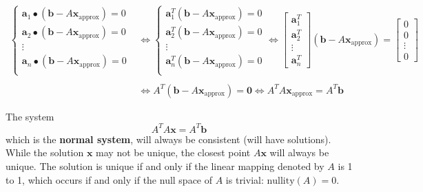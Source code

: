 \documentclass{article}
\begin{document}
\begin{align*}
\left\{\begin{array}{c}
\mathbf{a}_1 \bullet (\mathbf{b} - A\mathbf{x}_{\text{approx}}) = 0 \\
\mathbf{a}_2 \bullet (\mathbf{b} - A\mathbf{x}_{\text{approx}}) = 0 \\
\vdots \\
\mathbf{a}_n \bullet (\mathbf{b} - A\mathbf{x}_{\text{approx}}) = 0 \\
\end{array}\right. & \iff \left\{\begin{array}{c}
\mathbf{a}_1^T (\mathbf{b} - A\mathbf{x}_{\text{approx}}) = 0 \\
\mathbf{a}_2^T (\mathbf{b} - A\mathbf{x}_{\text{approx}}) = 0 \\
\vdots \\
\mathbf{a}_n^T (\mathbf{b} - A\mathbf{x}_{\text{approx}}) = 0 \\
\end{array}\right. \iff \begin{bmatrix}
\mathbf{a}_1^T \\ \mathbf{a}_2^T \\ \vdots \\ \mathbf{a}_n^T 
\end{bmatrix}(\mathbf{b} - A\mathbf{x}_{\text{approx}}) = \begin{bmatrix}
0 \\ 0 \\ \vdots \\ 0 
\end{bmatrix} \\ 
& \\
& \iff A^T(\mathbf{b} - A\mathbf{x}_{\text{approx}}) = \mathbf{0} 
\iff A^T A \mathbf{x}_{\text{approx}} = A^T \mathbf{b}
\end{align*}

The system 
\[A^T A \mathbf{x} = A^T \mathbf{b}\]
which is the {\bf normal system}, will always be consistent (will have solutions). While the solution \(\mathbf{x}\) may not be unique, the closest point \(A\mathbf{x}\) will always be unique. The solution is unique if and only if the linear mapping denoted by \(A\) is 1 to 1, which occurs if and only if the null space of \(A\) is trivial: \(\text{nullity}(A) = 0\).
\end{document}
